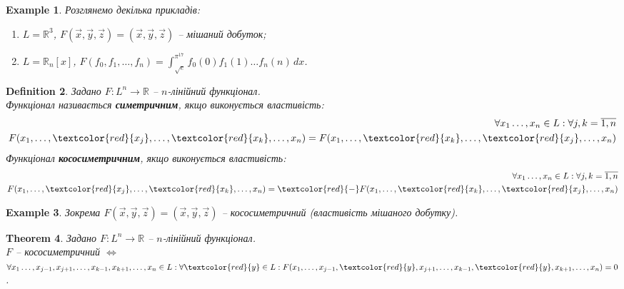 \documentclass[a4paper, 10pt]{article}
\theoremstyle{theoremdd}
\newtheorem{theorem}{Theorem}[subsection]
\newtheorem{definition}[theorem]{Definition}
\newtheorem{example}[theorem]{Example}
\begin{document}
	\begin{example} Розглянемо декілька прикладів:
	\begin{enumerate}[nosep, wide=0pt, label={\arabic*.}]
	\item $L = \mathbb{R}^3$, \quad $F(\vec{x},\vec{y},\vec{z}) = (\vec{x}, \vec{y}, \vec{z})$ -- мішаний добуток;
	\item $L = \mathbb{R}_n[x]$, \quad $F(f_0,f_1,\dots,f_n) = \displaystyle \int_{\sqrt{e}}^{\pi^{17}} f_0(0)f_1(1)\dots f_n(n) \,dx$.
	\end{enumerate}
	\end{example}
	
	\begin{definition}
	Задано $F \colon L^n \to \mathbb{R}$ -- $n$-лінійний функціонал.\\
	Функціонал називається \textbf{симетричним}, якщо виконується властивість:
	\begin{align*}
		\forall x_1 \dots, x_n \in L: \forall j,k = \overline{1,n}\\
	F(x_1, \dots, \textcolor{red}{x_j}, \dots, \textcolor{red}{x_k}, \dots, x_n) = F(x_1, \dots, \textcolor{red}{x_k}, \dots, \textcolor{red}{x_j}, \dots, x_n)
	\end{align*}
	Функціонал \textbf{кососиметричним}, якщо виконується властивість:
	\begin{align*}
	\forall x_1 \dots, x_n \in L: \forall j,k = \overline{1,n}\\
	F(x_1, \dots, \textcolor{red}{x_j}, \dots, \textcolor{red}{x_k}, \dots, x_n) = \textcolor{red}{-}F(x_1, \dots, \textcolor{red}{x_k}, \dots, \textcolor{red}{x_j}, \dots, x_n)
	\end{align*}
	\end{definition}
	
	\begin{example}
	Зокрема $F(\vec{x},\vec{y},\vec{z}) = (\vec{x}, \vec{y}, \vec{z})$ -- кососиметричний (властивість мішаного добутку).
	\end{example}
	
	\begin{theorem}
	Задано $F \colon L^n \to \mathbb{R}$ -- $n$-лінійний функціонал.\\
	$F$ -- кососиметричний $\iff$ $\forall x_1 \dots, x_{j-1}, x_{j+1}, \dots, x_{k-1}, x_{k+1}, \dots, x_{n} \in L: \forall \textcolor{red}{y} \in L: \\ F(x_1,\dots, x_{j-1}, \textcolor{red}{y}, x_{j+1}, \dots, x_{k-1}, \textcolor{red}{y}, x_{k+1}, \dots, x_n) = 0$.
	\end{theorem}
	
\end{document}
